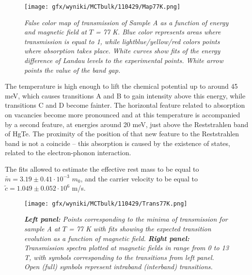 \documentclass[titlepage,a4paper]{book}
\begin{document}
\begin{figure}[ht]
	\centering
	\texttt{[image: gfx/wyniki/MCTbulk/110429/Map77K.png]}
	\vspace{-10pt}
	\caption{\textit{False color map of transmission of Sample A as a function of energy and magnetic field at $T$ = 77 K. Blue color represents areas where transmission is equal to 1, while lightblue/yellow/red colors points where absorption takes place. White curves show fits of the energy difference of Landau levels to the experimental points. White arrow points the value of the band gap.}}
	\label{fig:Map_110429_77K}
\end{figure} 

The temperature is high enough to lift the chemical potential up to around 45 meV, which causes transitions A and B to gain intensity above this energy, while transitions C and D become fainter. The horizontal feature related to absorption on vacancies become more pronounced and at this temperature is accompanied by a second feature, at energies around 20 meV, just above the Reststrahlen band of HgTe. The proximity of the position of that new feature to the Reststrahlen band is not a coincide -- this absorption is caused by the existence of states, related to the electron-phonon interaction.

The fits allowed to estimate the effective rest mass to be equal to $\tilde m = 3.19 \pm 0.41 \cdot 10^{-3}$ $m_0$, and the carrier velocity to be equal to $\tilde{c} = 1.049 \pm 0.052 \cdot 10^6$ m/s. 

\begin{figure}[ht]
	\centering
	\texttt{[image: gfx/wyniki/MCTbulk/110429/Trans77K.png]}
	\vspace{-10pt}
	\caption{\textit{\textbf{Left panel:} Points corresponding to the minima of transmission for sample A at $T$ = 77 K with fits showing the expected transition evolution as a function of magnetic field. \textbf{Right panel:} Transmission spectra plotted at magnetic fields in range from 0 to 13 T, with symbols corresponding to the transitions from left panel. Open (full) symbols represent intraband (interband) transitions.}}
	\label{fig:Spectra_110429_77K}
\end{figure}
\end{document}
